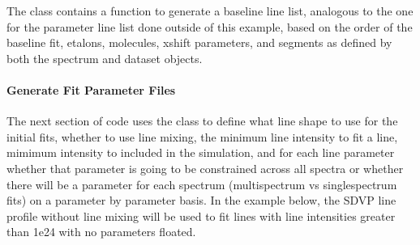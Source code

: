 \documentclass[letterpaper,10pt,english]{sphinxmanual}
\begin{document}
\sphinxAtStartPar
The {\hyperref[\detokenize{MATS:MATS.dataset.Dataset}]{}} class contains a function to generate a baseline line list, analogous to the one for the parameter line list done outside of this example, based on the order of the baseline fit, etalons, molecules, x\sphinxhyphen{}shift parameters, and segments as defined by both the spectrum and dataset objects.

\begin{sphinxVerbatim}[commandchars=\\\{\}]
  
\end{sphinxVerbatim}


\paragraph{Generate Fit Parameter Files}
\label{\detokenize{Fitting Synthetic Spectra:generate-fit-parameter-files}}
\sphinxAtStartPar
The next section of code uses the {\hyperref[\detokenize{MATS:MATS.generate_fitparam_file.Generate_FitParam_File}]{}} class to define what line shape to use for the initial fits, whether to use line mixing, the minimum line intensity to fit a line, mimimum intensity to included in the simulation, and for each line parameter whether that parameter is going to be constrained across all spectra or whether there will be a parameter for each spectrum (multi\sphinxhyphen{}spectrum vs single\sphinxhyphen{}spectrum fits) on a parameter by parameter basis.  In the example below, the SDVP line profile without line mixing will be used to fit lines with line intensities greater than 1e\sphinxhyphen{}24 with no parameters floated.
\end{document}
